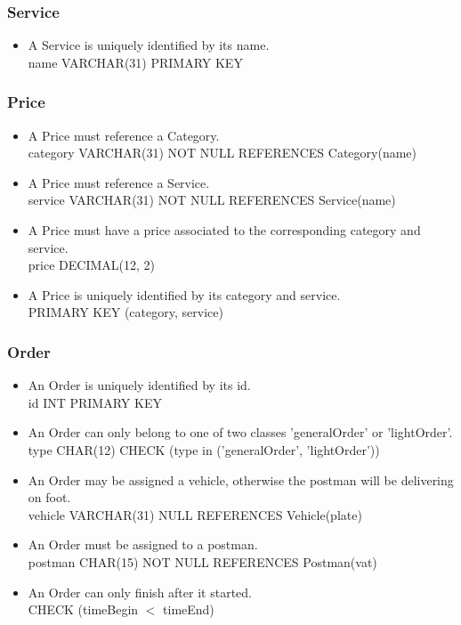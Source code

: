 \documentclass{report}[a4paper]
\theoremstyle{remark}
\begin{document}
\subsubsection{Service}
\begin{itemize}
    \item A Service is uniquely identified by its name. \\ name VARCHAR(31) PRIMARY KEY
\end{itemize}
\subsubsection{Price}
\begin{itemize}
    \item A Price must reference a Category. \\ category VARCHAR(31) NOT NULL REFERENCES Category(name)
    \item A Price must reference a Service. \\ service VARCHAR(31) NOT NULL REFERENCES Service(name)
    \item A Price must have a price associated to the corresponding category and service. \\ price DECIMAL(12, 2)
    \item A Price is uniquely identified by its category and service. \\ PRIMARY KEY (category, service)
\end{itemize}
\subsubsection{Order}
\begin{itemize}
    \item An Order is uniquely identified by its id. \\ id INT PRIMARY KEY
    \item An Order can only belong to one of two classes 'generalOrder' or 'lightOrder'. \\ type CHAR(12) CHECK (type in ('generalOrder', 'lightOrder'))
    \item An Order may be assigned a vehicle, otherwise the postman will be delivering on foot. \\ vehicle VARCHAR(31) NULL REFERENCES Vehicle(plate)
    \item An Order must be assigned to a postman. \\ postman CHAR(15) NOT NULL REFERENCES Postman(vat)
    \item An Order can only finish after it started. \\ CHECK (timeBegin $<$ timeEnd)
\end{itemize}
\end{document}
